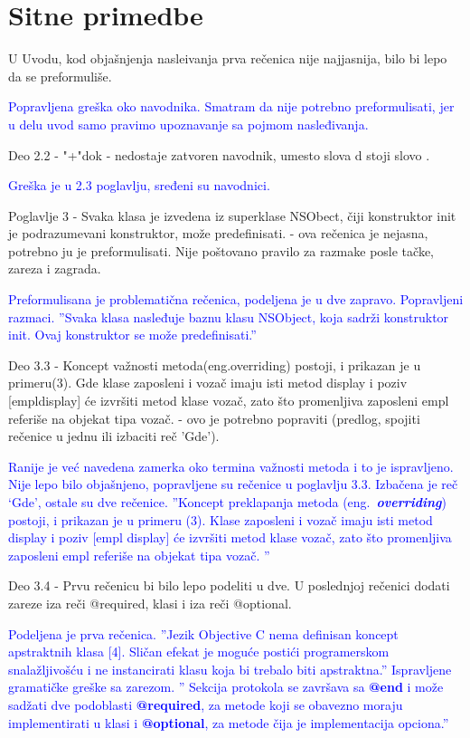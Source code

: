 \documentclass[a4paper]{report}
\newcommand{\odgovor}[1]{\textcolor{blue}{#1}}
\begin{document}
\section{Sitne primedbe}
U Uvodu, kod obja\v snjenja nasle\dj{}ivanja prva re\v cenica nije najjasnija, bilo bi lepo da se preformuli\v se.

\odgovor{
Popravljena greška oko navodnika. Smatram da nije potrebno preformulisati, jer u delu uvod samo pravimo upoznavanje sa pojmom nasleđivanja. }

Deo 2.2 - "+"dok - nedostaje zatvoren navodnik, umesto slova d stoji slovo \dj{}.

\odgovor{
Greška je u 2.3 poglavlju, sređeni su navodnici.}

Poglavlje 3 - Svaka klasa je izvedena iz superklase NSObect, \v ciji konstruktor init je podrazumevani konstruktor, mo\v ze predefinisati. - ova re\v cenica je nejasna, potrebno ju je preformulisati. Nije po\v stovano pravilo za razmake posle ta\v cke, zareza i zagrada.

\odgovor{
Preformulisana je problematična rečenica, podeljena je u dve zapravo. Popravljeni razmaci.
''Svaka klasa nasleđuje baznu klasu NSObject, koja sadrži konstruktor init. Ovaj konstruktor se može predefinisati.''
}

Deo 3.3 - Koncept va\v znosti metoda(eng.overriding) postoji, i prikazan je u primeru(3). Gde klase zaposleni i voza\v c imaju isti metod display i poziv [empldisplay] \'ce izvr\v siti metod klase voza\v c, zato \v sto promenljiva zaposleni empl referi\v se na objekat tipa voza\v c. - ovo je potrebno popraviti (predlog, spojiti re\v cenice u jednu ili izbaciti re\v c 'Gde').

\odgovor{
Ranije je već navedena zamerka oko termina važnosti metoda i to je ispravljeno. Nije lepo bilo objašnjeno, popravljene su rečenice u poglavlju 3.3. Izbačena je reč `Gde', ostale su dve rečenice. ''Koncept preklapanja metoda (eng.~\textbf{\em overriding})  postoji, i prikazan je u primeru (3). Klase zaposleni i vozač imaju isti metod display i poziv [empl display] će izvršiti metod klase vozač, zato što promenljiva zaposleni empl referiše na objekat tipa vozač. ''
}

Deo 3.4 - Prvu re\v cenicu bi bilo lepo podeliti u dve. U poslednjoj re\v cenici dodati zareze iza re\v ci @required, klasi i iza re\v ci @optional.

\odgovor{
Podeljena je prva rečenica.
''Jezik Objective C nema definisan koncept apstraktnih klasa [4]. Sličan efekat je moguće postići programerskom snalažljivošću i ne instancirati klasu koja bi trebalo biti apstraktna.''
Ispravljene gramatičke greške sa zarezom.
'' Sekcija protokola se završava sa \textbf{@end} i može sadžati dve podoblasti \textbf{@required}, za metode koji se obavezno moraju implementirati u klasi i \textbf{@optional}, za metode čija je implementacija opciona.''
}
\end{document}
